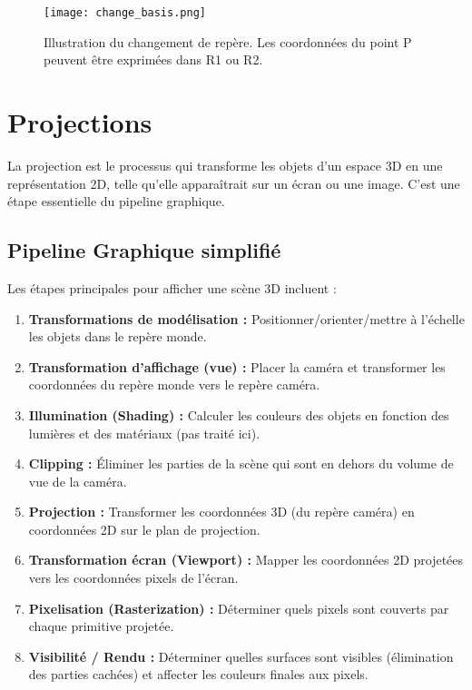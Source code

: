 \documentclass{article}
\begin{document}
\begin{figure}[H]
\centering
\texttt{[image: change\_basis.png]}
\caption{Illustration du changement de repère. Les coordonnées du point P peuvent être exprimées dans R1 ou R2.}
\label{fig:change_basis}
\end{figure}

\section{Projections}

La projection est le processus qui transforme les objets d'un espace 3D en une représentation 2D, telle qu'elle apparaîtrait sur un écran ou une image. C'est une étape essentielle du pipeline graphique.

\subsection{Pipeline Graphique simplifié}
Les étapes principales pour afficher une scène 3D incluent :
\begin{enumerate}
    \item \textbf{Transformations de modélisation :} Positionner/orienter/mettre à l'échelle les objets dans le repère monde.
    \item \textbf{Transformation d'affichage (vue) :} Placer la caméra et transformer les coordonnées du repère monde vers le repère caméra.
    \item \textbf{Illumination (Shading) :} Calculer les couleurs des objets en fonction des lumières et des matériaux (pas traité ici).
    \item \textbf{Clipping :} Éliminer les parties de la scène qui sont en dehors du volume de vue de la caméra.
    \item \textbf{Projection :} Transformer les coordonnées 3D (du repère caméra) en coordonnées 2D sur le plan de projection.
    \item \textbf{Transformation écran (Viewport) :} Mapper les coordonnées 2D projetées vers les coordonnées pixels de l'écran.
    \item \textbf{Pixelisation (Rasterization) :} Déterminer quels pixels sont couverts par chaque primitive projetée.
    \item \textbf{Visibilité / Rendu :} Déterminer quelles surfaces sont visibles (élimination des parties cachées) et affecter les couleurs finales aux pixels.
\end{enumerate}
\end{document}
